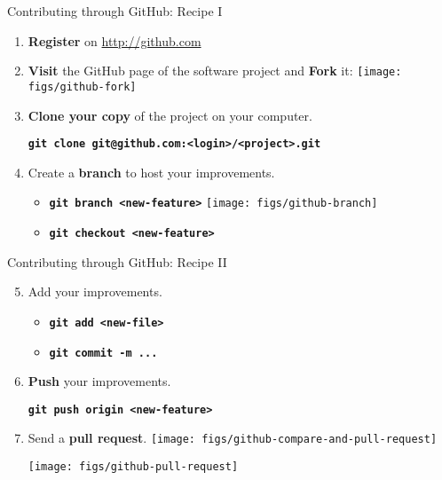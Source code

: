 \documentclass{beamer}
\begin{document}
\begin{frame}{Contributing through GitHub: Recipe I}
  \begin{enumerate}
  \item \textbf{Register} on \url{http://github.com}
  \item \textbf{Visit} the GitHub page of the software project and
    \textbf{Fork} it:
    \hbox{\hspace{-1cm}\texttt{[image: figs/github-fork]}}
  \item \textbf{Clone your copy} of the project on your computer.
    \begin{center}
      \begin{footnotesize}
        \texttt{\textbf{git clone git@github.com:<login>/<project>.git}}
      \end{footnotesize}
    \end{center}
  \item Create a \textbf{branch} to host your improvements.
    \begin{itemize}
    \item \texttt{\textbf{git branch <new-feature>}} \texttt{[image: figs/github-branch]}
    \item \texttt{\textbf{git checkout <new-feature>}}
    \end{itemize}
  \end{enumerate}
\end{frame}

\begin{frame}{Contributing through GitHub: Recipe II}
  \begin{enumerate}
    \setcounter{enumi}{4}
  \item Add your improvements.
    \begin{itemize}
    \item \texttt{\textbf{git add <new-file>}}
    \item \texttt{\textbf{git commit -m ...}}
    \end{itemize}    
  \item \textbf{Push} your improvements.
    \begin{center}
      \texttt{\textbf{git push origin <new-feature>}}
    \end{center}
  \item Send a \textbf{pull request}.
    \texttt{[image: figs/github-compare-and-pull-request]}
    \begin{center}
      \hbox{\hspace{-0cm}\texttt{[image: figs/github-pull-request]}}
    \end{center}
  \end{enumerate}
\end{frame}
\end{document}
